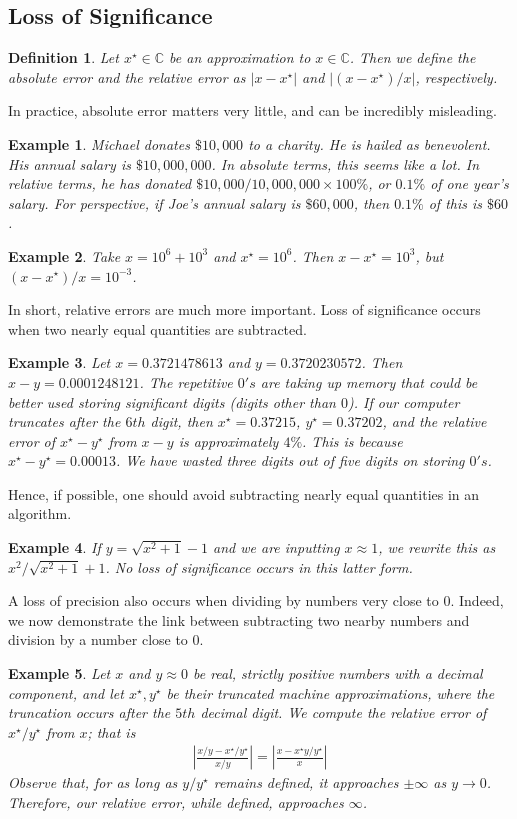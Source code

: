 \documentclass[12pt,reqno]{amsart}
\numberwithin{equation}{section}  %
\newcommand{\cc}{\mathbb{C}}
\newcommand{\dollar}{\$}
\newtheorem*{definition}{Definition}
\newtheorem*{example}{Example}
\begin{document}
\subsection{Loss of Significance}
\begin{definition}
Let $x^\star \in \cc$ be an approximation to $x \in \cc$. Then we define
the \emph{absolute error} and the \emph{relative error} as $|x - x^\star|$
and $|(x - x^\star)/x|$, respectively.
\end{definition}
In practice, absolute error matters very little, and can be incredibly
misleading.
\begin{example}
Michael donates $\dollar 10,000$ to a charity. He is hailed as benevolent. 
His annual salary is $ \dollar 10,000,000$. In absolute terms, this seems like a lot.
In relative terms, he has donated $\dollar 10,000/10,000,000 \times 100 \%$, or $0.1 \%$ of one year's salary. For
perspective, if Joe's annual salary is $\dollar 60,000$, then $0.1 \%$
of this is $\dollar 60$.
\end{example}
\begin{example}
Take $x = 10^6 + 10^3$ and $x^\star = 10^6$. Then $x - x^\star = 10^3$,
but $(x - x^\star)/x = 10^{-3}$.
\end{example}
In short, relative errors are much more important. 
Loss of significance occurs when two nearly equal quantities are subtracted.
\begin{example}
Let $x = 0.3721478613$ and $y = 0.3720230572$. Then $x-y = 0.0001248121$.
The repetitive $0's$ are taking up memory that could be better used storing
significant digits (digits other than $0$). If our computer truncates
after the $6th$ digit, then
$x^\star = 0.37215$, $y^\star = 0.37202$, and the relative error
of $x^\star-y^\star$ from $x-y$ is approximately $4\%$. This is because
$x^\star - y^\star = 0.00013$. We have wasted three digits out of
five digits on storing $0's$.
\end{example}
Hence, if possible, one should avoid subtracting nearly equal quantities
in an algorithm.
\begin{example}
If $y = \sqrt{x^2 + 1} -1$ and we are inputting $x \approx 1$, we rewrite this as $x^2/\sqrt{x^2 + 1} + 1$.
No loss of significance occurs in this latter form.
\end{example}
A loss of precision also occurs when dividing by numbers very close to $0$.
Indeed, we now demonstrate the link between subtracting two nearby numbers
and division by a number close to $0$.
\begin{example}
 Let $x$ and $y \approx 0$ be real, strictly positive
numbers with a decimal component, and let $x^\star, y^\star$ be their truncated
machine approximations, where the truncation occurs after the $5th$ decimal digit.
We compute the relative error of $x^\star/y^\star$ from $x$; that is
\begin{align*}
\left |\frac{x/y - x^\star/y^\star}{x/y} \right |   = \left | \frac{x - x^\star
y/y^\star}{x} \right |
\end{align*}
Observe that, for as long as $y/y^\star$ remains defined, it approaches
$\pm \infty$ as $y \to 0$. 
Therefore, our relative error, while defined, approaches $\infty$.
\end{example}
\end{document}

